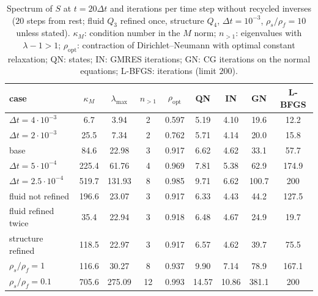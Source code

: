 \documentclass[11pt,a4paper]{article}
\theoremstyle{definition}
\theoremstyle{remark}
\newcommand{\M}{M}
\begin{document}
\begin{table}[ht]\centering
\caption{Spectrum of $S$ at $t=20\Delta t$ and iterations per time step without recycled inverses
($20$ steps from rest; fluid $Q_3$ refined once, structure $Q_4$, $\Delta t=10^{-3}$,
$\rho_s/\rho_f=10$ unless stated). $\kappa_{\M}$: condition number in the $\M$ norm;
$n_{>1}$: eigenvalues with $\lambda-1>1$; $\rho_{\mathrm{opt}}$: contraction of Dirichlet--Neumann
with optimal constant relaxation; QN: states; IN: GMRES iterations; GN: CG iterations on the normal
equations; L-BFGS: iterations (limit $200$).}\label{tab:spectrum}
\begin{tabular}{lcccc|cccc}
\toprule
case & $\kappa_{\M}$ & $\lambda_{\max}$ & $n_{>1}$ & $\rho_{\mathrm{opt}}$ & QN & IN & GN & L-BFGS\\
\midrule
$\Delta t=4\cdot10^{-3}$ & 6.7 & 3.94 & 2 & 0.597 & 5.19 & 4.10 & 19.6 & 12.2\\
$\Delta t=2\cdot10^{-3}$ & 25.5 & 7.34 & 2 & 0.762 & 5.71 & 4.14 & 20.0 & 15.8\\
base & 84.6 & 22.98 & 3 & 0.917 & 6.62 & 4.62 & 33.1 & 57.7\\
$\Delta t=5\cdot10^{-4}$ & 225.4 & 61.76 & 4 & 0.969 & 7.81 & 5.38 & 62.9 & 174.9\\
$\Delta t=2.5\cdot10^{-4}$ & 519.7 & 131.93 & 8 & 0.985 & 9.71 & 6.62 & 100.7 & 200\\
fluid not refined & 196.6 & 23.07 & 3 & 0.917 & 6.33 & 4.43 & 44.2 & 127.5\\
fluid refined twice & 35.4 & 22.94 & 3 & 0.918 & 6.48 & 4.67 & 24.9 & 19.7\\
structure refined & 118.5 & 22.97 & 3 & 0.917 & 6.57 & 4.62 & 39.7 & 75.5\\
$\rho_s/\rho_f=1$ & 116.6 & 30.27 & 8 & 0.937 & 9.90 & 7.14 & 78.9 & 167.1\\
$\rho_s/\rho_f=0.1$ & 705.6 & 275.09 & 12 & 0.993 & 14.57 & 10.86 & 381.1 & 200\\
\bottomrule
\end{tabular}
\end{table}
\end{document}

